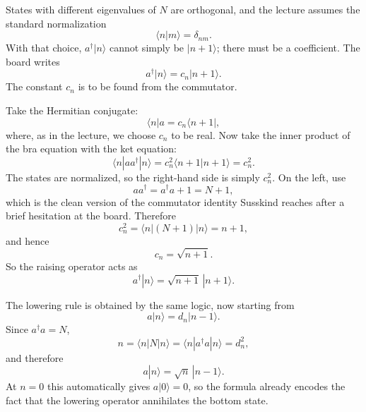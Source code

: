 States with different eigenvalues of \(N\) are orthogonal, and the lecture assumes the standard normalization
\begin{equation}
\langle n|m\rangle=\delta_{nm}.
\end{equation}
With that choice, \(a^\dagger|n\rangle\) cannot simply be \(|n+1\rangle\); there must be a coefficient. The board writes
\begin{equation}
a^\dagger|n\rangle=c_n|n+1\rangle.
\end{equation}
The constant \(c_n\) is to be found from the commutator.

Take the Hermitian conjugate:
\begin{equation}
\langle n|a = c_n \langle n+1|,
\end{equation}
where, as in the lecture, we choose \(c_n\) to be real. Now take the inner product of the bra equation with the ket equation:
\begin{equation}
\langle n|aa^\dagger|n\rangle
=
c_n^2 \langle n+1|n+1\rangle
=
c_n^2.
\end{equation}
The states are normalized, so the right-hand side is simply \(c_n^2\). On the left, use
\begin{equation}
aa^\dagger=a^\dagger a+1=N+1,
\end{equation}
which is the clean version of the commutator identity Susskind reaches after a brief hesitation at the board. Therefore
\begin{equation}
c_n^2=\langle n|(N+1)|n\rangle = n+1,
\end{equation}
and hence
\begin{equation}
c_n=\sqrt{n+1}.
\end{equation}
So the raising operator acts as
\begin{equation}
a^\dagger|n\rangle=\sqrt{n+1}\,|n+1\rangle.
\end{equation}

The lowering rule is obtained by the same logic, now starting from
\[
a|n\rangle=d_n|n-1\rangle.
\]
Since \(a^\dagger a=N\),
\begin{equation}
n=\langle n|N|n\rangle=\langle n|a^\dagger a|n\rangle=d_n^2,
\end{equation}
and therefore
\begin{equation}
a|n\rangle=\sqrt n\,|n-1\rangle.
\end{equation}
At \(n=0\) this automatically gives \(a|0\rangle=0\), so the formula already encodes the fact that the lowering operator annihilates the bottom state.

